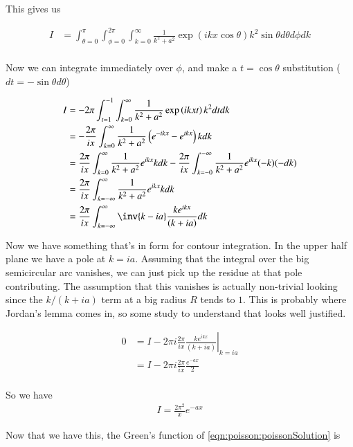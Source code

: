 This gives us

\begin{align*}
I &= \int_{\theta=0}^{\pi} \int_{\phi=0}^{2\pi} \int_{k=0}^\infty \frac{1}{k^2 + a^2} \exp\left( i k x \cos\theta \right)
k^2 \sin\theta d\theta d\phi dk \\
\end{align*}

Now we can integrate immediately over $\phi$, and make a $t = \cos\theta$ substitution ($dt = -\sin\theta d\theta$)

\begin{align*}
I
&= - 2\pi \int_{t=1}^{-1} \int_{k=0}^\infty \frac{1}{k^2 + a^2} \exp\left( i k x t \right) k^2 dt dk \\
&= - \frac{2\pi}{ix} \int_{k=0}^\infty \frac{1}{k^2 + a^2}
\left(
e^{-i k x } -e^{i k x }
\right)
k dk \\
&= \frac{2\pi}{ix} \int_{k=0}^\infty \frac{1}{k^2 + a^2}
e^{i k x }
k dk
- \frac{2\pi}{ix} \int_{k=-0}^{-\infty} \frac{1}{k^2 + a^2}
e^{i k x }
(-k) (-dk) \\
&= \frac{2\pi}{ix} \int_{k=-\infty}^\infty \frac{1}{k^2 + a^2} e^{i k x } k dk \\
&= \frac{2\pi}{ix} \int_{k=-\infty}^\infty \inv{k - ia} \frac{ k e^{ i k x } }{(k + ia)} dk \\
\end{align*}

Now we have something that's in form for contour integration.  In the upper half plane we have a pole at $k= ia$.  Assuming that the
integral over the big semicircular arc vanishes, we can just pick up the residue at that pole contributing.  The assumption that
this vanishes is actually non-trivial looking since the $k/(k+ia)$ term at a big radius $R$ tends to $1$.  This is probably where
Jordan's lemma comes in, so some study to understand that looks well justified.

\begin{align*}
0
&= I - 2 \pi i {\left. \frac{2\pi}{ix} \frac{ k e^{ i k x } }{(k + ia)} \right\vert}_{k= ia} \\
&= I - 2 \pi i \frac{2\pi}{ix} \frac{ e^{ - a x } }{2} \\
\end{align*}

So we have
\begin{align*}
I = \frac{2 \pi^2}{x} e^{ - a x }
\end{align*}

Now that we have this, the Green's function of \ref{eqn:poisson:poissonSolution} is

